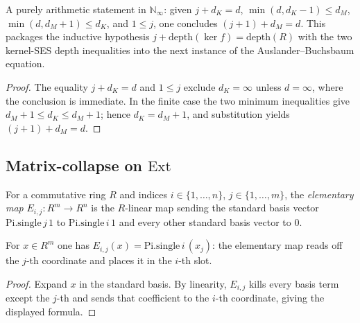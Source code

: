 \begin{lemma}\leanok
  \label{lem:enat_ab_inductive_combine}
  A purely arithmetic statement in \(\mathbb N_\infty\): given \(j + d_K = d\),
  \(\min(d, d_K - 1) \leq d_M\), \(\min(d, d_M + 1) \leq d_K\), and \(1 \leq j\), one
  concludes \((j + 1) + d_M = d\). This packages the inductive hypothesis
  \(j + \text{depth}(\ker f) = \text{depth}(R)\) with the two kernel-SES depth
  inequalities into the next instance of the Auslander--Buchsbaum equation.
\end{lemma}
\begin{proof}

\leanok
  The equality \(j+d_K=d\) and \(1\leq j\) exclude \(d_K=\infty\)
  unless \(d=\infty\), where the conclusion is immediate. In the finite
  case the two minimum inequalities give
  \(d_M+1\leq d_K\leq d_M+1\); hence \(d_K=d_M+1\), and substitution yields
  \((j+1)+d_M=d\).
\end{proof}

\subsection{Matrix-collapse on \texorpdfstring{\(\text{Ext}\)}{Ext}}
\label{subsec:ab_matrix_collapse_substrate}

\begin{definition}\leanok
  \label{def:elemMap}
  For a commutative ring \(R\) and indices \(i \in \{1, \dots, n\}\),
  \(j \in \{1, \dots, m\}\), the \emph{elementary map} \(E_{i,j} : R^m \to R^n\) is the
  \(R\)-linear map sending the standard basis vector \(\text{Pi.single}\,j\,1\) to
  \(\text{Pi.single}\,i\,1\) and every other standard basis vector to \(0\).
\end{definition}

\begin{lemma}\leanok
  \label{lem:elemMap_apply}
  For \(x \in R^m\) one has \(E_{i,j}(x) = \text{Pi.single}\,i\,(x_j)\): the elementary
  map reads off the \(j\)-th coordinate and places it in the \(i\)-th slot.
\end{lemma}
\begin{proof}

\leanok
  Expand \(x\) in the standard basis. By linearity, \(E_{i,j}\)
  kills every basis term except the \(j\)-th and sends that coefficient to
  the \(i\)-th coordinate, giving the displayed formula.
\end{proof}

